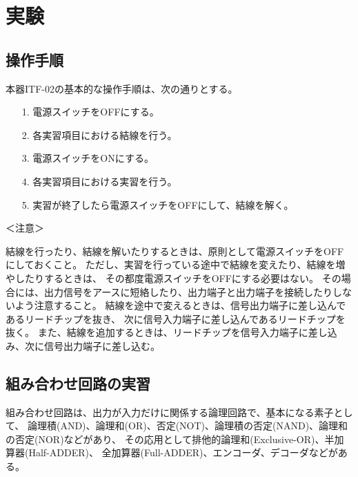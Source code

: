 \documentclass[12pt]{jarticle}
\begin{document}
\section{実験}
\subsection{操作手順}

本器ITF-02の基本的な操作手順は、次の通りとする。
\begin{itemize}
    \item[1.] 電源スイッチをOFFにする。
    \item[2.] 各実習項目における結線を行う。
    \item[3.] 電源スイッチをONにする。
    \item[4.] 各実習項目における実習を行う。
    \item[5.] 実習が終了したら電源スイッチをOFFにして、結線を解く。
\end{itemize}

＜注意＞

結線を行ったり、結線を解いたりするときは、原則として電源スイッチをOFFにしておくこと。
ただし、実習を行っている途中で結線を変えたり、結線を増やしたりするときは、
その都度電源スイッチをOFFにする必要はない。
その場合には、出力信号をアースに短絡したり、出力端子と出力端子を接続したりしないよう注意すること。
結線を途中で変えるときは、信号出力端子に差し込んであるリードチップを抜き、
次に信号入力端子に差し込んであるリードチップを抜く。
また、結線を追加するときは、リードチップを信号入力端子に差し込み、次に信号出力端子に差し込む。

\subsection{組み合わせ回路の実習}
組み合わせ回路は、出力が入力だけに関係する論理回路で、基本になる素子として、
論理積(AND)、論理和(OR)、否定(NOT)、論理積の否定(NAND)、論理和の否定(NOR)などがあり、
その応用として排他的論理和(Exclusive-OR)、半加算器(Half-ADDER)、
全加算器(Full-ADDER)、エンコーダ、デコーダなどがある。
\end{document}
